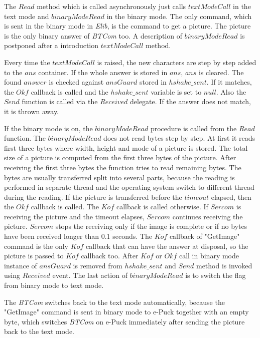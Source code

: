 	The $Read$ method which is called asynchronously just calls $textModeCall$
	in the text mode and $binaryModeRead$ in the binary mode.
	The only command, which is sent in the binary mode in {\it Elib}, is the command to get a picture.
	The picture is the only binary answer of {\it BTCom} too.
	A description of $binaryModeRead$ is postponed after  
	a introduction $textModeCall$ method.
	
	Every time the $textModeCall$ is raised, the new characters are step by step
	added to the $ans$ container. If the whole answer is stored in $ans$, $ans$ is cleared.
	The found $answer$ is checked against $ansGuard$ stored in $hshake\_sent$.
	If it matches, the $Okf$ callback is called and the $hshake\_sent$ variable is set to $null$. 
	Also the $Send$ function is called via the $Received$ delegate. If the answer does not match, it is thrown away. 
	
	If the binary mode is on, the $binaryModeRead$ procedure is called from
	the $Read$ function. The $binaryModeRead$ does not read bytes step by step.
	At first it reads first three bytes where width, height and mode of a picture is stored.
	The total size of a picture is computed from the first three bytes of the picture.
	After receiving the first three bytes the function tries to read remaining bytes.
	The bytes are usually transferred split into several parts,
	because the reading is performed in separate thread and 
	the operating system switch to different thread during the reading.
	If the picture is transferred before the $timeout$ elapsed, then the $Okf$ callback is called.
	The $Kof$ callback is called otherwise. 
	If $Sercom$ is receiving the picture and the timeout elapses,
	$Sercom$ continues receiving the picture. $Sercom$ stops the receiving only if
	the image is complete or if no bytes have been received longer than 0.1 seconds.
	The $Kof$ callback of "GetImage" command is the only $Kof$ callback 
	that can have the answer at disposal, so the picture is passed to $Kof$ callback too.	
	After $Kof$ or $Okf$ call in binary mode instance of $ansGuard$ is removed from $hshake\_sent$ 
	and $Send$ method is invoked using $Received$ event.
	The last action of $binaryModeRead$ is to switch the flag from binary mode to text mode.
	
	The {\it BTCom} switches back to the text mode automatically, because
	the "GetImage" command is sent in binary mode to e-Puck together with an empty byte, which
	switches {\it BTCom} on e-Puck  immediately after sending the picture back to the text mode.

